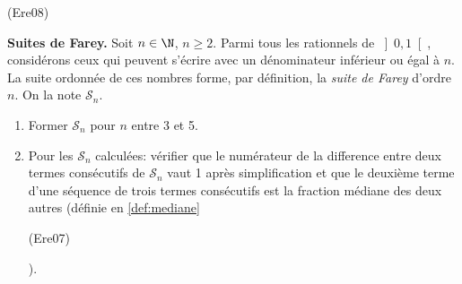 \begin{tiny}(Ere08)\end{tiny} \textbf{Suites de Farey.} \label{def:farey} Soit $n \in \N$, $n\geq 2$.\newline
Parmi tous les rationnels de $\left]0,1\right[$, consid{\'e}rons ceux qui peuvent s'{\'e}crire avec un d{\'e}nominateur inf{\'e}rieur ou {\'e}gal {\`a} $n$. La suite ordonn{\'e}e de ces nombres forme, par d{\'e}finition, la \emph{suite de Farey} d'ordre $n$. On la note $\mathcal{S}_{n}$. 
\begin{enumerate}
  \item Former $\mathcal{S}_{n}$ pour $n$ entre 3 et 5.
  \item Pour les $\mathcal{S}_{n}$ calculées: v{\'e}rifier que le num{\'e}rateur de la difference entre deux termes cons{\'e}cutifs de $\mathcal{S}_{n}$ vaut 1 apr{\`e}s
simplification et que le deuxi{\`e}me terme d'une s{\'e}quence de trois termes cons{\'e}cutifs est la fraction m{\'e}diane des deux autres (définie en \ref{def:mediane} \begin{tiny}(Ere07)                                                                                                                                                                         \end{tiny}).

\end{enumerate}
